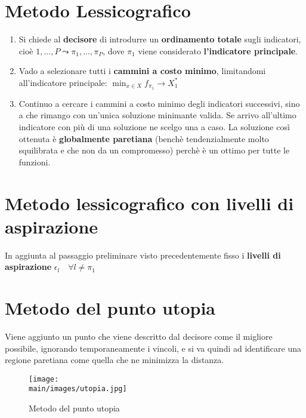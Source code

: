 \documentclass[\main/main.tex]{subfiles}
\begin{document}
\section{Metodo Lessicografico}
\begin{enumerate}
	\item Si chiede al \textbf{decisore} di introdurre un \textbf{ordinamento totale} sugli indicatori, cioè ${1, \dots, P}\leadsto{\pi_1, \dots, \pi_P}$, dove $\pi_1$ viene considerato \textbf{l'indicatore principale}.
	\item Vado a selezionare tutti i \textbf{cammini a costo minimo}, limitandomi all'indicatore principale: $\min_{x \in X} f_{\pi_1} \rightarrow X_1^*$
	\item Continuo a cercare i cammini a costo minimo degli indicatori successivi, sino a che rimango con un'unica soluzione minimante valida. Se arrivo all'ultimo indicatore con più di una soluzione ne scelgo una a caso. La soluzione così ottenuta è \textbf{globalmente paretiana} (benchè tendenzialmente molto squilibrata e che non da un compromesso) perchè è un ottimo per tutte le funzioni.
\end{enumerate}

\section{Metodo lessicografico con livelli di aspirazione}
In aggiunta al passaggio preliminare visto precedentemente fisso i \textbf{livelli di aspirazione} $\epsilon_l \quad \forall l \not = \pi_1$

\section{Metodo del punto utopia}
Viene aggiunto un punto che viene descritto dal decisore come il migliore possibile, ignorando temporaneamente i vincoli, e si va quindi ad identificare una regione paretiana come quella che ne minimizza la distanza.

\begin{figure}[H]
	\centering
	\texttt{[image: \\main/images/utopia.jpg]}
	\caption{Metodo del punto utopia}
\end{figure}
\end{document}
